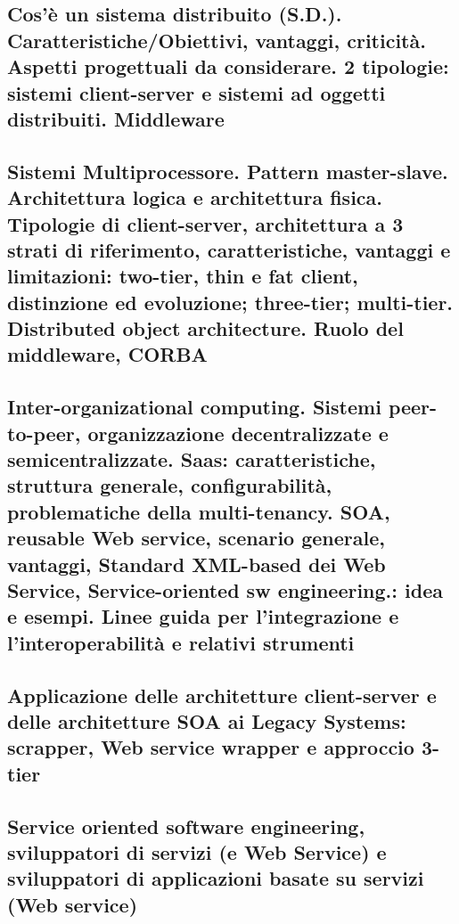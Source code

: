 \subsection{Cos’è un sistema distribuito (S.D.). Caratteristiche/Obiettivi, vantaggi, criticità. Aspetti progettuali da considerare. 2 tipologie: sistemi client-server e sistemi ad oggetti distribuiti. Middleware}
\subsection{Sistemi Multiprocessore. Pattern master-slave. Architettura logica e architettura fisica. Tipologie di client-server, architettura a 3 strati di riferimento, caratteristiche, vantaggi e limitazioni: two-tier, thin e fat client, distinzione ed evoluzione; three-tier; multi-tier. Distributed object architecture. Ruolo del middleware, CORBA}
\subsection{Inter-organizational computing. Sistemi peer-to-peer, organizzazione decentralizzate e semicentralizzate. Saas: caratteristiche, struttura generale, configurabilità, problematiche della multi-tenancy. SOA, reusable Web service, scenario generale, vantaggi, Standard XML-based dei Web Service, Service-oriented sw engineering.: idea e esempi. Linee guida per l’integrazione e l’interoperabilità e relativi strumenti}
\subsection{Applicazione delle architetture client-server e delle architetture SOA ai Legacy Systems: scrapper, Web service wrapper e approccio 3-tier}
\subsection{Service oriented software engineering, sviluppatori di servizi (e Web Service) e sviluppatori di applicazioni basate su servizi (Web service)}